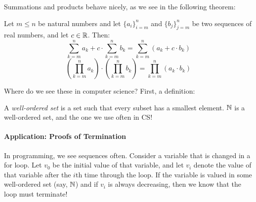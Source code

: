 Summations and products behave nicely, as we see in the following theorem:

\begin{theorem}
    Let $m \leq n$ be natural numbers and
    let $\{a_i\}_{i=m}^n$ and $\{b_j\}_{j=m}^n$ be two sequences of real
    numbers, and let $c \in {\mathbb R}$.  Then:
    $$\sum_{k=m}^n a_k + c \cdot \sum_{k=m}^n b_k = \sum_{k=m}^n (a_k+ c\cdot b_k)$$
    $$\left( \prod_{k=m}^n a_k \right) \cdot \left(  \prod_{k=m}^n b_k \right)
        = \prod_{k=m}^n \left(a_k \cdot b_k\right)$$
\end{theorem}

Where do we see these in computer science? First, a definition:

\begin{definition}
    A \emph{well-ordered set} is a set such that every subset has a smallest
    element. ${\mathbb N}$ is a well-ordered set, and the one we use often in CS!
\end{definition}

\paragraph{Application: Proofs of Termination}
In programming, we see sequences often.  Consider a variable that is changed in
a for loop.  Let $v_0$ be the initial value of that variable, and let $v_i$
denote the value of that variable after the $i$th time through the loop.
If the variable is valued in some well-ordered set (say, ${\mathbb N}$) and if
$v_i$ is always decreasing, then we know that the loop must terminate!
